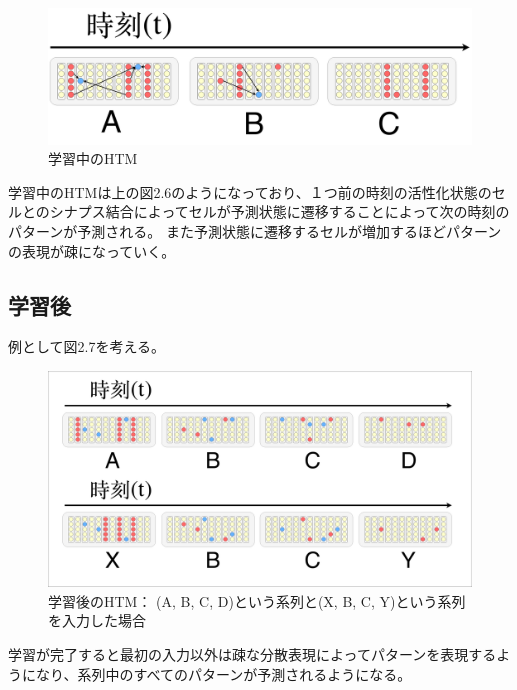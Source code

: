 \begin{figure}[ht]
  \begin{center}
    \includegraphics[width=14cm]{./fig/drawing_7}
    \caption{学習中のHTM}
    \label{fig:HTM_during_learning}
  \end{center}
\end{figure}

学習中のHTMは上の図2.6のようになっており、１つ前の時刻の活性化状態のセルとのシナプス結合によってセルが予測状態に遷移することによって次の時刻のパターンが予測される。
また予測状態に遷移するセルが増加するほどパターンの表現が疎になっていく。

\subsection{学習後}
例として図2.7を考える。

\begin{figure}[ht]
  \begin{center}
    \includegraphics[width=14cm]{./fig/drawing_6}
    \caption{学習後のHTM： (A, B, C, D)という系列と(X, B, C, Y)という系列を入力した場合}
    \label{fig:HTM_after_learning}
  \end{center}
\end{figure}

学習が完了すると最初の入力以外は疎な分散表現によってパターンを表現するようになり、系列中のすべてのパターンが予測されるようになる。

